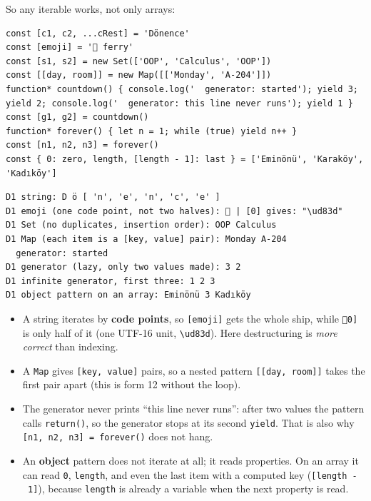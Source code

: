 \documentclass[
  10pt,
]{article}
\providecommand{\tightlist}{%
  \setlength{\itemsep}{0pt}\setlength{\parskip}{0pt}}
\begin{document}
So any iterable works, not only arrays:

\begin{verbatim}
const [c1, c2, ...cRest] = 'Dönence'
const [emoji] = '🚢 ferry'
const [s1, s2] = new Set(['OOP', 'Calculus', 'OOP'])
const [[day, room]] = new Map([['Monday', 'A-204']])
function* countdown() { console.log('  generator: started'); yield 3; yield 2; console.log('  generator: this line never runs'); yield 1 }
const [g1, g2] = countdown()
function* forever() { let n = 1; while (true) yield n++ }
const [n1, n2, n3] = forever()
const { 0: zero, length, [length - 1]: last } = ['Eminönü', 'Karaköy', 'Kadıköy']
\end{verbatim}

\begin{verbatim}
D1 string: D ö [ 'n', 'e', 'n', 'c', 'e' ]
D1 emoji (one code point, not two halves): 🚢 | [0] gives: "\ud83d"
D1 Set (no duplicates, insertion order): OOP Calculus
D1 Map (each item is a [key, value] pair): Monday A-204
  generator: started
D1 generator (lazy, only two values made): 3 2
D1 infinite generator, first three: 1 2 3
D1 object pattern on an array: Eminönü 3 Kadıköy
\end{verbatim}

\begin{itemize}
\tightlist
\item
  A string iterates by \textbf{code points}, so
  \texttt{{[}emoji{]\allowbreak{}}} gets the whole ship, while
  \texttt{\allowbreak{}\textquotesingle{}🚢\allowbreak{}\textquotesingle{}{[}0{]\allowbreak{}}}
  is only half of it (one UTF-16 unit, \texttt{\textbackslash{}ud83d}).
  Here destructuring is \emph{more correct} than indexing.
\item
  A \texttt{Map} gives \texttt{{[}key,\ value{]\allowbreak{}}} pairs, so
  a nested pattern
  \texttt{{[}{[}day,\ room{]\allowbreak{}}{]\allowbreak{}}} takes the
  first pair apart (this is form 12 without the loop).
\item
  The generator never prints ``this line never runs'': after two values
  the pattern calls \texttt{return()}, so the generator stops at its
  second \texttt{yield}. That is also why
  \texttt{{[}n1,\ n2,\ n3{]\allowbreak{}}\ =\ forever()} does not hang.
\item
  An \textbf{object} pattern does not iterate at all; it reads
  properties. On an array it can read \texttt{0}, \texttt{length}, and
  even the last item with a computed key
  (\texttt{{[}length\ -\ 1{]\allowbreak{}}}), because \texttt{length} is
  already a variable when the next property is read.
\end{itemize}
\end{document}

